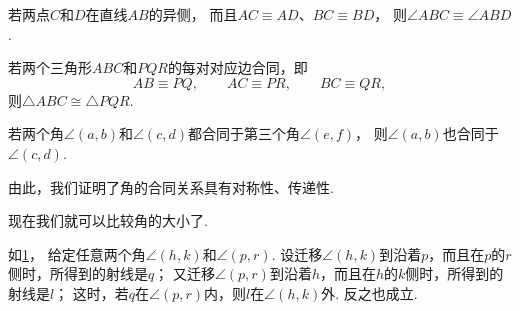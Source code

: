 \begin{theorem}\label{theorem:欧氏几何.定理17}
若两点\(C\)和\(D\)在直线\(AB\)的异侧，
而且\(AC \equiv AD\)、\(BC \equiv BD\)，
则\(\angle ABC \equiv \angle ABD\).
\end{theorem}

\begin{theorem}[三角形的合同定理3]\label{theorem:欧氏几何.定理18}
若两个三角形\(ABC\)和\(PQR\)的每对对应边合同，即
\begin{equation*}
AB \equiv PQ, \qquad
AC \equiv PR, \qquad
BC \equiv QR,
\end{equation*}
则\(\triangle ABC \cong \triangle PQR\).
\end{theorem}

\begin{theorem}\label{theorem:欧氏几何.定理19}
若两个角\(\angle(a,b)\)和\(\angle(c,d)\)都合同于第三个角\(\angle(e,f)\)，
则\(\angle(a,b)\)也合同于\(\angle(c,d)\).
\end{theorem}
由此，我们证明了角的合同关系具有对称性、传递性.

现在我们就可以比较角的大小了.

\begin{theorem}\label{theorem:欧氏几何.定理20}
如\cref{figure:欧氏几何.图20}，
给定任意两个角\(\angle(h,k)\)和\(\angle(p,r)\).
设迁移\(\angle(h,k)\)到沿着\(p\)，而且在\(p\)的\(r\)侧时，所得到的射线是\(q\)；
又迁移\(\angle(p,r)\)到沿着\(h\)，而且在\(h\)的\(k\)侧时，所得到的射线是\(l\)；
这时，若\(q\)在\(\angle(p,r)\)内，则\(l\)在\(\angle(h,k)\)外.
反之也成立.
\end{theorem}

\begin{figure}[htb]
	\centering
	\caption{}
	\label{figure:欧氏几何.图20}
\end{figure}

